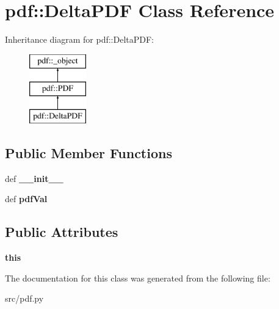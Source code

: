 \hypertarget{classpdf_1_1DeltaPDF}{
\section{pdf::DeltaPDF Class Reference}
\label{dc/d18/classpdf_1_1DeltaPDF}
}
Inheritance diagram for pdf::DeltaPDF:\begin{figure}[H]
\begin{center}
\leavevmode
\includegraphics[height=3cm]{dc/d18/classpdf_1_1DeltaPDF}
\end{center}
\end{figure}
\subsection*{Public Member Functions}
\begin{DoxyCompactItemize}
\item 
\hypertarget{classpdf_1_1DeltaPDF_a6fdc3ea1145460c7872f078ae4c53f47}{
def {\bfseries \_\-\_\-init\_\-\_\-}}
\label{dc/d18/classpdf_1_1DeltaPDF_a6fdc3ea1145460c7872f078ae4c53f47}

\item 
\hypertarget{classpdf_1_1DeltaPDF_a39f58564645df6ada5bdfa96bdea11c9}{
def {\bfseries pdfVal}}
\label{dc/d18/classpdf_1_1DeltaPDF_a39f58564645df6ada5bdfa96bdea11c9}

\end{DoxyCompactItemize}
\subsection*{Public Attributes}
\begin{DoxyCompactItemize}
\item 
\hypertarget{classpdf_1_1DeltaPDF_a5060ddf377ac837c54c16a4f56bd10a6}{
{\bfseries this}}
\label{dc/d18/classpdf_1_1DeltaPDF_a5060ddf377ac837c54c16a4f56bd10a6}

\end{DoxyCompactItemize}


The documentation for this class was generated from the following file:\begin{DoxyCompactItemize}
\item 
src/pdf.py\end{DoxyCompactItemize}
